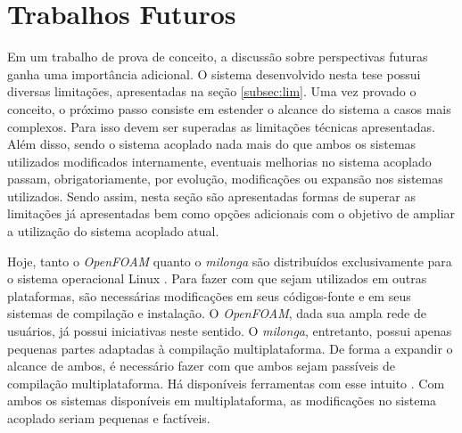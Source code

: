 \section{Trabalhos Futuros}

Em um trabalho de prova de conceito, a discussão sobre perspectivas futuras ganha uma importância adicional.
O sistema desenvolvido nesta tese possui diversas limitações, apresentadas na seção \ref{subsec:lim}. Uma vez
provado o conceito, o próximo passo consiste em estender o alcance do sistema a casos mais complexos. Para
isso devem ser superadas as limitações técnicas apresentadas. Além disso, sendo o sistema acoplado nada
mais do que ambos os sistemas utilizados modificados internamente, eventuais melhorias no sistema acoplado
passam, obrigatoriamente, por evolução, modificações ou expansão nos sistemas utilizados. Sendo assim, nesta seção são apresentadas formas
de superar as limitações já apresentadas bem como opções adicionais com o objetivo de ampliar a utilização
do sistema acoplado atual. 

Hoje, tanto o \textit{OpenFOAM} quanto o \textit{milonga} são distribuídos exclusivamente para o sistema
operacional Linux \cite{LinuxBritannica}. Para fazer com que sejam utilizados em outras plataformas, são necessárias
modificações em seus códigos-fonte e em seus sistemas de compilação e instalação. O \textit{OpenFOAM}, dada sua
ampla rede de usuários, já possui iniciativas neste sentido. O \textit{milonga}, entretanto, possui apenas pequenas partes
adaptadas à compilação multiplataforma. De forma a expandir o alcance de ambos, é necessário fazer com que ambos
sejam passíveis de compilação multiplataforma. Há disponíveis ferramentas com esse intuito \cite{Martin2008}. Com ambos os
sistemas disponíveis em multiplataforma, as modificações no sistema acoplado seriam pequenas e factíveis.

